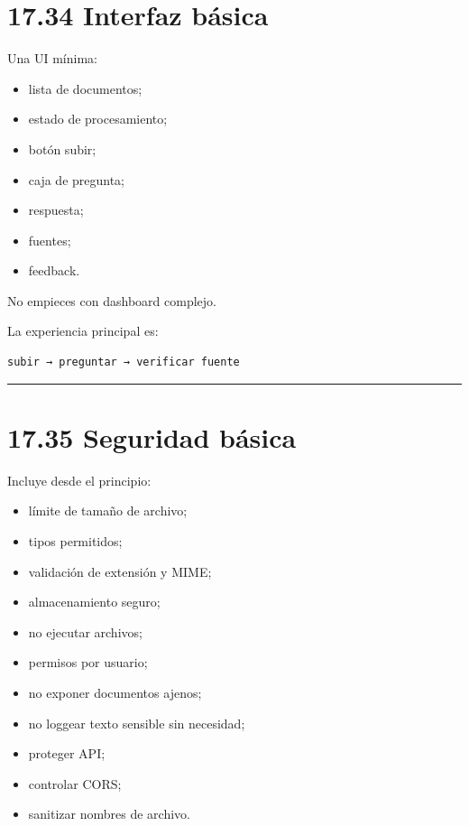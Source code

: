 \section{17.34 Interfaz básica}\label{interfaz-buxe1sica}

Una UI mínima:

\begin{itemize}
\tightlist
\item
  lista de documentos;
\item
  estado de procesamiento;
\item
  botón subir;
\item
  caja de pregunta;
\item
  respuesta;
\item
  fuentes;
\item
  feedback.
\end{itemize}

No empieces con dashboard complejo.

La experiencia principal es:

\begin{lstlisting}
subir → preguntar → verificar fuente
\end{lstlisting}

\begin{center}\rule{0.5\linewidth}{0.5pt}\end{center}

\section{17.35 Seguridad básica}\label{seguridad-buxe1sica}

Incluye desde el principio:

\begin{itemize}
\tightlist
\item
  límite de tamaño de archivo;
\item
  tipos permitidos;
\item
  validación de extensión y MIME;
\item
  almacenamiento seguro;
\item
  no ejecutar archivos;
\item
  permisos por usuario;
\item
  no exponer documentos ajenos;
\item
  no loggear texto sensible sin necesidad;
\item
  proteger API;
\item
  controlar CORS;
\item
  sanitizar nombres de archivo.
\end{itemize}

